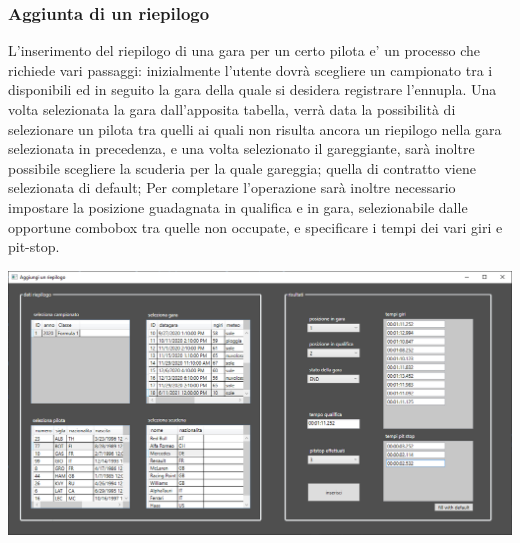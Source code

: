 \documentclass[a4paper,12pt]{report}
\begin{document}
{{				\subsubsection{Aggiunta di un riepilogo}
					L'inserimento del riepilogo di una gara per un certo pilota e' un processo che richiede vari passaggi:
					inizialmente l'utente dovrà scegliere un campionato tra i disponibili ed in seguito la gara della quale si desidera registrare
					l'ennupla.
					Una volta selezionata la gara dall'apposita tabella, verrà data la possibilità di selezionare un pilota tra quelli 
					ai quali non risulta ancora un riepilogo nella gara selezionata in precedenza, e una volta selezionato il gareggiante,
					sarà inoltre possibile scegliere la scuderia per la quale gareggia; quella di contratto viene selezionata di default;
					Per completare l'operazione sarà inoltre necessario impostare la posizione guadagnata in qualifica e in gara, selezionabile
					dalle opportune combobox tra quelle non occupate, e specificare i tempi dei vari giri e pit-stop.
					\begin{center}
							\hspace*{-1cm}%
							\includegraphics[scale=0.57, angle=90]{copies/riepilogo.png} 
							\hspace*{-4cm}%
					\end{center}
}}
\end{document}

